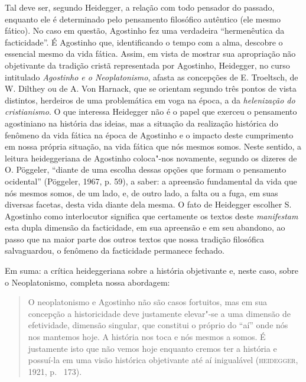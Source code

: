 Tal deve ser, segundo Heidegger, a relação com todo pensador do
passado, enquanto ele é determinado pelo pensamento filosófico
autêntico (ele mesmo fático). No caso em questão, Agostinho fez
uma verdadeira “hermenêutica da facticidade”. É Agostinho que,
identificando o tempo com a alma, descobre o essencial mesmo da
vida fática. Assim, em vista de mostrar sua apropriação
não objetivante da tradição cristã representada por Agostinho,
Heidegger, no curso intitulado \emph{Agostinho e o
Neoplatonismo}, afasta as concepções de E. Troeltsch, de W.
Dilthey ou de A. Von Harnack, que se orientam segundo três
pontos de vista distintos, herdeiros de uma problemática em voga
na época, a da \emph{helenização do cristianismo}. O que
interessa Heidegger não é o papel que exerceu o pensamento
agostiniano na história das ideias, mas a situação da realização
histórica do fenômeno da vida fática na época de Agostinho e o
impacto deste cumprimento em nossa própria situação, na vida
fática que nós mesmos somos. Neste sentido, a leitura
heideggeriana de Agostinho coloca"-nos novamente, segundo os
dizeres de O. Pöggeler, “diante de uma escolha dessas opções que
formam o pensamento ocidental” (Pöggeler, 1967, p. 59), a saber:
a apreensão fundamental da vida que nós mesmos somos, de um
lado, e, de outro lado, a falta ou a fuga, em suas diversas
facetas, desta vida diante dela mesma. O fato de Heidegger
escolher S. Agostinho como interlocutor significa que certamente
os textos deste \emph{manifestam} esta dupla dimensão da
facticidade, em sua apreensão e em seu abandono, ao passo que na
maior parte dos outros textos que nossa tradição filosófica
salvaguardou, o fenômeno da facticidade permanece fechado. 

Em suma: a crítica heideggeriana sobre a história objetivante e,
neste caso, sobre o Neoplatonismo, completa nossa abordagem:

\begin{quote}
O neoplatonismo e Agostinho não são casos fortuitos, mas em sua
concepção a historicidade deve justamente elevar"-se a uma
dimensão de efetividade, dimensão singular, que constitui o
próprio do “aí” onde nós nos mantemos hoje. A história nos toca
e nós mesmos a somos. É justamente isto que não vemos hoje
enquanto cremos ter a história e possuí-la em uma visão
histórica objetivante até aí inigualável (\textsc{heidegger}, 1921, p.~%
173). 
\end{quote}

